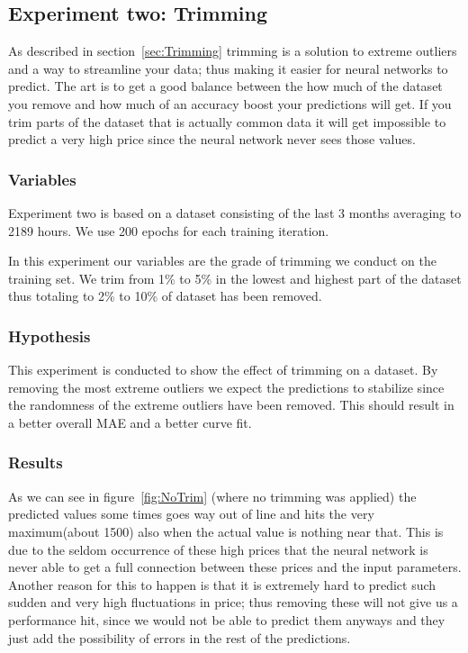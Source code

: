 \newpage
\subsection{Experiment two: Trimming}
\label{sec:priceExperimentTwo}
As described in section~\ref{sec:Trimming} trimming is a solution to extreme outliers and a way to streamline your data; thus making it easier for neural networks to predict. The art is to get a good balance between the how much of the dataset you remove and how much of an accuracy boost your predictions will get. If you trim parts of the dataset that is actually common data it will get impossible to predict a very high price since the neural network never sees those values.

\subsubsection{Variables}
Experiment two is based on a dataset consisting of the last 3 months averaging to 2189 hours. We use 200 epochs for each training iteration.

In this experiment our variables are the grade of trimming we conduct on the training set. We trim from 1\% to 5\% in the lowest and highest part of the dataset thus totaling to 2\% to 10\% of dataset has been removed.

\subsubsection{Hypothesis}
This experiment is conducted to show the effect of trimming on a dataset. By removing the most extreme outliers we expect the predictions to stabilize since the randomness of the extreme outliers have been removed. This should result in a better overall MAE and a better curve fit.

\subsubsection{Results}

As we can see in figure~\ref{fig:NoTrim} (where no trimming was applied) the predicted values some times goes way out of line and hits the very maximum(about 1500) also when the actual value is nothing near that. This is due to the seldom occurrence of these high prices that the neural network is never able to get a full connection between these prices and the input parameters. Another reason for this to happen is that it is extremely hard to predict such sudden and very high fluctuations in price; thus removing these will not give us a performance hit, since we would not be able to predict them anyways and they just add the possibility of errors in the rest of the predictions.

